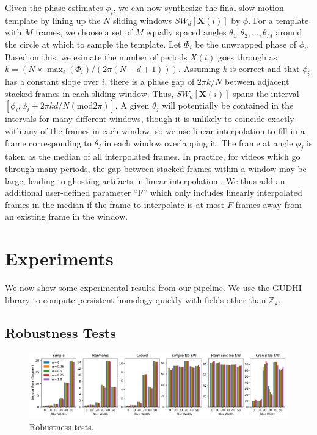 \documentclass{article}
\newcommand{\mb}{\mathbf}
\begin{document}
Given the phase estimates $\phi_i$, we can now synthesize the final slow motion template by lining up the $N$ sliding windows $SW_{d}[\mb{X}(i)]$ by $\phi$.  For a template with $M$ frames, we choose a set of $M$ equally spaced angles $\theta_1, \theta_2, ..., \theta_M$ around the circle at which to sample the template.  Let $\Phi_i$ be the unwrapped phase of $\phi_i$.  Based on this, we esimate the number of periods $X(t)$ goes through as $k = (N \times \max_i(\Phi_i) / (2 \pi (N-d+1)))$.  Assuming $k$ is correct and that $\phi_i$ has a constant slope over $i$, there is a phase gap of $2 \pi k/N$ between adjacent stacked frames in each sliding window.  Thus, $SW_{d}[\mb{X}(i)]$ spans the interval $[\phi_i, \phi_i + 2\pi k d/N (\text{mod} 2 \pi)]$.  A given $\theta_j$ will potentially be contained in the intervals for many different windows, though it is unlikely to coincide exactly with any of the frames in each window, so we use linear interpolation to fill in a frame corresponding to $\theta_j$ in each window overlapping it.  The frame at angle $\phi_j$ is taken as the median of all interpolated frames.  In practice, for videos which go through many periods, the gap between stacked frames within a window may be large, leading to ghosting artifacts in linear interpolation \cite{meyer2015phase}.  We thus add an additional user-defined parameter ``F'' which only includes linearly interpolated frames in the median if the frame to interpolate is at most $F$ frames away from an existing frame in the window. %

\section{Experiments}
\label{sec:experiments}

We now show some experimental results from our pipeline.  We use the GUDHI library\cite{maria2014gudhi} to compute persistent homology quickly with fields other than $\mathbb{Z}_2$.

\subsection{Robustness Tests}


\begin{figure}
\centering
\includegraphics[width=\columnwidth]{RobustnessTestsShake.pdf}
\caption{Robustness tests.}
\label{fig:RobustnessTestsShake}
\end{figure}
\end{document}
